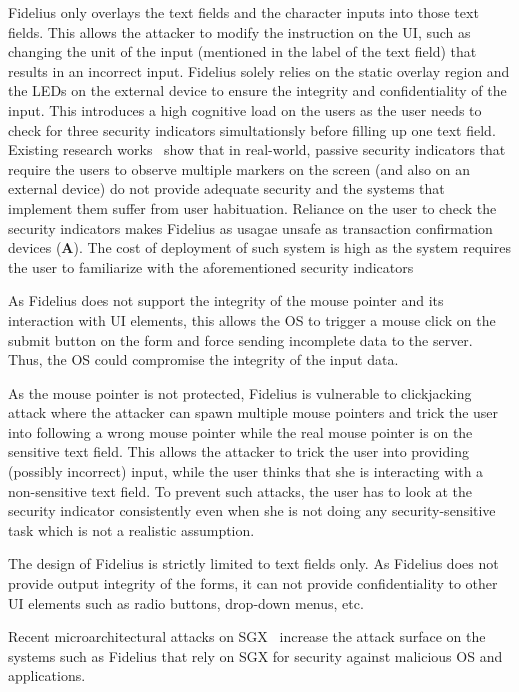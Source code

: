 \begin{mylist}
\item Fidelius only overlays the text fields and the character inputs into those text fields. This allows the attacker to modify the instruction on the UI, such as changing the unit of the input (mentioned in the label of the text field) that results in an incorrect input. Fidelius solely relies on the static overlay region and the LEDs on the external device to ensure the integrity and confidentiality of the input. This introduces a high cognitive load on the users as the user needs to check for three security indicators simultationsly before filling up one text field. Existing research works~\cite{egelman2008you,sobey2008exploring} show that in real-world, passive security indicators that require the users to observe multiple markers on the screen (and also on an external device) do not provide adequate security and the systems that implement them suffer from user habituation. Reliance on the user to check the security indicators makes Fidelius as usagae unsafe as transaction confirmation devices (\textbf{A}). 
The cost of deployment of such system is high as the system requires the user to familiarize with the aforementioned security indicators 
\item As Fidelius does not support the integrity of the mouse pointer and its interaction with UI elements, this allows the OS to trigger a mouse click on the submit button on the form and force sending incomplete data to the server. Thus, the OS could compromise the integrity of the input data. 
\item As the mouse pointer is not protected, Fidelius is vulnerable to clickjacking attack where the attacker can spawn multiple mouse pointers and trick the user into following a wrong mouse pointer while the real mouse pointer is on the sensitive text field. This allows the attacker to trick the user into providing (possibly incorrect) input, while the user thinks that she is interacting with a non-sensitive text field. To prevent such attacks, the user has to look at the security indicator consistently even when she is not doing any security-sensitive task which is not a realistic assumption. 
\item The design of Fidelius is strictly limited to text fields only. As Fidelius does not provide output integrity of the forms, it can not provide confidentiality to other UI elements such as radio buttons, drop-down menus, etc.
\item Recent microarchitectural attacks on SGX~\cite{van2018foreshadow} increase the attack surface on the systems such as Fidelius that rely on SGX for security against malicious OS and applications. 
\end{mylist}

